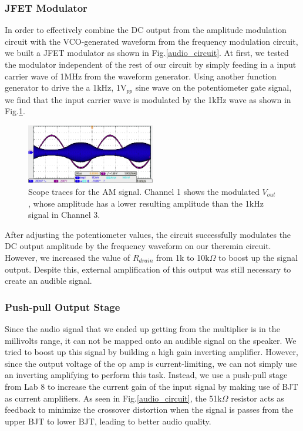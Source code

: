 \documentclass[twocolumn]{article}
\begin{document}
\subsubsection{JFET Modulator}
In order to effectively combine the DC output from the amplitude modulation circuit with the VCO-generated waveform from the frequency modulation circuit, we built a JFET modulator as shown in Fig.\ref{audio_circuit}. At first, we tested the modulator independent of the rest of our circuit by simply feeding in a input carrier wave of 1MHz  from the waveform generator. Using another function generator to drive the a 1kHz, 1V$_{pp}$ sine wave on the potentiometer gate signal, we find that the input carrier wave  is modulated by the 1kHz wave as shown in Fig.\ref{q9trace}.
 \begin{figure}[h!]
 \centering
 \includegraphics[width=0.5\textwidth]{figure/q9trace}
\caption{Scope traces for the AM signal. Channel 1 shows the modulated $V_{out}$, whose amplitude has a lower resulting amplitude than the 1kHz signal in Channel 3.}
\label{q9trace}
 \end{figure}
\par  After adjusting the potentiometer values, the circuit successfully modulates the DC output amplitude by the frequency waveform on our theremin circuit. However, we increased the value of $R_{drain}$ from 1k to 10k$\Omega$ to boost up the signal output. Despite this, external amplification of this output was still necessary to create an audible signal. 
\subsubsection{Push-pull Output Stage}
Since the audio signal that we ended up getting from the multiplier is in the millivolts range, it can not be mapped onto an audible signal on the speaker. We tried to boost up this signal by building a high gain inverting amplifier. However, since the output voltage of the op amp is current-limiting, we can not simply use an inverting amplifying to perform this task. Instead, we use a push-pull stage from Lab 8 to increase the current gain of the input signal by making use of BJT as current amplifiers. As seen in Fig.\ref{audio_circuit}, the 51k$\Omega$ resistor acts as feedback to minimize the crossover distortion when the signal is passes from the upper BJT to lower BJT, leading to better audio quality.
\end{document}
